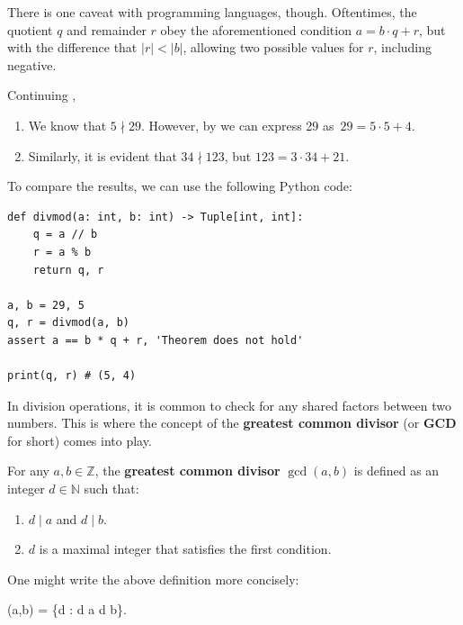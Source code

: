 \documentclass[../../book.tex]{subfiles}
\begin{document}
\begin{remark}
    There is one caveat with programming languages, though. Oftentimes, the
    quotient $q$ and remainder $r$ obey the aforementioned condition $a=b\cdot q+r$,
    but with the difference that $|r| < |b|$, allowing two possible values for $r$,
    including negative. 
\end{remark}

\begin{example} \label{example:divisibility_2}
    Continuing , \hfill
    \begin{enumerate}
        \item We know that $5 \nmid 29$. However, by  we can express 29 
        as~$29 = 5 \cdot 5 + 4$.
        \item Similarly, it is evident that $34 \nmid 123$, but $123 = 3 \cdot 34 + 21$.
    \end{enumerate}

    To compare the results, we can use the following Python code:
\begin{verbatim}
def divmod(a: int, b: int) -> Tuple[int, int]:
    q = a // b
    r = a % b
    return q, r
    
a, b = 29, 5
q, r = divmod(a, b)
assert a == b * q + r, 'Theorem does not hold'

print(q, r) # (5, 4)
\end{verbatim}
\end{example}

In division operations, it is common to check for any shared factors between two
numbers. This is where the concept of the \textbf{greatest common divisor} (or
\textbf{GCD} for short) comes into play.

\begin{definition}[GCD]
    For any $a, b \in \mathbb{Z}$, the \textbf{greatest common divisor} $\gcd(a, b)$ is defined as an integer $d \in \mathbb{N}$ such that:
    \begin{enumerate}
        \item $d \mid a$ and $d \mid b$.
        \item $d$ is a maximal integer that satisfies the first condition.
    \end{enumerate}

    One might write the above definition more concisely:
    \begin{xequation}
        \gcd(a,b) = \max\{d \in {}: d \mid a \;  \; d \mid b\}.
    \end{xequation}
\end{definition}
\end{document}

